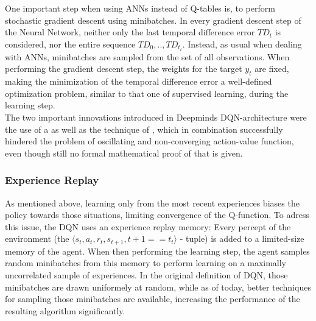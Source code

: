 One important step when using ANNs instead of Q-tables is, to perform stochastic gradient descent using minibatches. In every gradient descent step of the Neural Network, neither only the last temporal difference error $TD_t$ is considered, nor the entire sequence $TD_0, .., TD_{t_t}$. Instead, as usual when dealing with ANNs, minibatches are sampled from the set of all observations. When performing the gradient descent step, the weights for the target $y_t$ are fixed, making the minimization of the temporal difference error a well-defined optimization problem, similar to that one of supervised learning, during the learning step.\\

\noindent The two important innovations introduced in Deepminds DQN-architecture were the use of a  as well as the technique of , which in combination successfully hindered the problem of oscillating and non-converging action-value function, even though still no formal mathematical proof of that is given. %

\subsubsection{Experience Replay}
As mentioned above, learning only from the most recent experiences biases the policy towards those situations, limiting convergence of the Q-function. To adress this issue, the DQN uses an experience replay memory: Every percept of the environment (the $\langle s_t, a_t, r_t, s_{t+1}, t+1==t_t \rangle$ - tuple) is added to a limited-size memory of the agent. When then performing the learning step, the agent samples random minibatches from this memory to perform learning on a maximally uncorrelated sample of experiences. In the original definition of DQN, those minibatches are drawn uniformely at random, while as of today, better techniques for sampling those minibatches are available\cite{schaul_prioritized_2015}, increasing the performance of the resulting algorithm significantly. %

